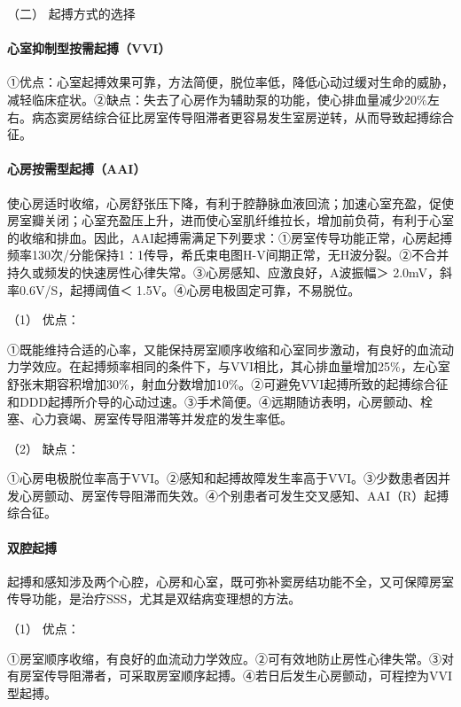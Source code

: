 \hypertarget{text00298.htmlux5cux23CHP10-2-11-4-4-2}{}
（二） 起搏方式的选择

\paragraph{心室抑制型按需起搏（VVI）}

①优点：心室起搏效果可靠，方法简便，脱位率低，降低心动过缓对生命的威胁，减轻临床症状。②缺点：失去了心房作为辅助泵的功能，使心排血量减少20\%左右。病态窦房结综合征比房室传导阻滞者更容易发生室房逆转，从而导致起搏综合征。

\paragraph{心房按需型起搏（AAI）}

使心房适时收缩，心房舒张压下降，有利于腔静脉血液回流；加速心室充盈，促使房室瓣关闭；心室充盈压上升，进而使心室肌纤维拉长，增加前负荷，有利于心室的收缩和排血。因此，AAI起搏需满足下列要求：①房室传导功能正常，心房起搏频率130次/分能保持1∶1传导，希氏束电图H-V间期正常，无H波分裂。②不合并持久或频发的快速房性心律失常。③心房感知、应激良好，A波振幅＞
2.0mV，斜率0.6V/S，起搏阈值＜ 1.5V。④心房电极固定可靠，不易脱位。

\hypertarget{text00298.htmlux5cux23CHP10-2-11-4-4-2-2-1}{}
（1） 优点：

①既能维持合适的心率，又能保持房室顺序收缩和心室同步激动，有良好的血流动力学效应。在起搏频率相同的条件下，与VVI相比，其心排血量增加25\%，左心室舒张末期容积增加30\%，射血分数增加10\%。②可避免VVI起搏所致的起搏综合征和DDD起搏所介导的心动过速。③手术简便。④远期随访表明，心房颤动、栓塞、心力衰竭、房室传导阻滞等并发症的发生率低。

\hypertarget{text00298.htmlux5cux23CHP10-2-11-4-4-2-2-2}{}
（2） 缺点：

①心房电极脱位率高于VVI。②感知和起搏故障发生率高于VVI。③少数患者因并发心房颤动、房室传导阻滞而失效。④个别患者可发生交叉感知、AAI（R）起搏综合征。

\paragraph{双腔起搏}

起搏和感知涉及两个心腔，心房和心室，既可弥补窦房结功能不全，又可保障房室传导功能，是治疗SSS，尤其是双结病变理想的方法。

\hypertarget{text00298.htmlux5cux23CHP10-2-11-4-4-2-3-1}{}
（1） 优点：

①房室顺序收缩，有良好的血流动力学效应。②可有效地防止房性心律失常。③对有房室传导阻滞者，可采取房室顺序起搏。④若日后发生心房颤动，可程控为VVI型起搏。

